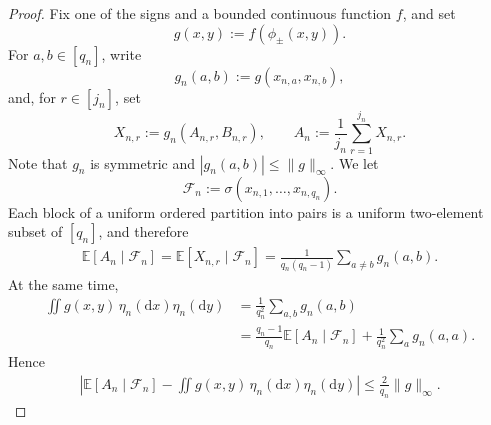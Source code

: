 \documentclass[10pt,a4paper]{amsart}
\newcommand{\Exb}[1]{\mathbb{E}\left[#1\right]}
\newcommand{\cF}{\mathcal{F}}
\begin{document}
\begin{proof}
	Fix one of the signs and a bounded continuous function $f$, and set
		\[
		g(x,y):=f(\phi_\pm(x,y)).
		\]
	For $a,b\in[q_n]$, write
		\[
		g_n(a,b):=g(x_{n,a},x_{n,b}),
		\]
	and, for $r\in[j_n]$, set
		\[
		X_{n,r}:=g_n(A_{n,r},B_{n,r}),
		\qquad
		A_n:=\frac{1}{j_n}\sum_{r=1}^{j_n}X_{n,r}.
		\]
	Note that $g_n$ is symmetric and $|g_n(a,b)|\le\|g\|_\infty$. We let
		\[
		\cF_n:=\sigma(x_{n,1},\ldots,x_{n,q_n}).
		\]
	Each block of a uniform ordered partition into pairs is a uniform two-element subset of $[q_n]$, and therefore
	\begin{align*}
		\Exb{A_n\mid\cF_n} = \Exb{X_{n,r}\mid\cF_n} = \frac{1}{q_n(q_n-1)} \sum_{a\ne b}g_n(a,b).
	\end{align*}
	At the same time,
	\begin{align*}
		\iint g(x,y)\,\eta_n(\mathrm{d}x)\eta_n(\mathrm{d}y)
		&= \frac{1}{q_n^2}\sum_{a,b}g_n(a,b)\\
		&= \frac{q_n-1}{q_n}\Exb{A_n\mid\cF_n} +\frac{1}{q_n^2}\sum_a g_n(a,a).
	\end{align*}
	Hence
	\begin{align}
		\label{eq:yo0}
		\left| \Exb{A_n\mid\cF_n} -\iint g(x,y)\,\eta_n(\mathrm{d}x)\eta_n(\mathrm{d}y) \right| \le\frac{2}{q_n}\|g\|_\infty.
	\end{align}
		

\end{proof}
\end{document}

